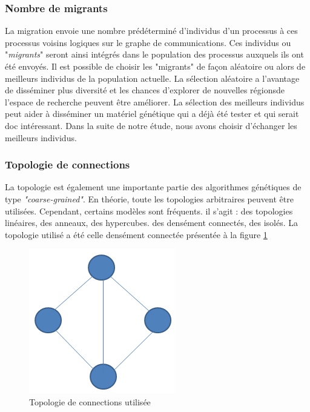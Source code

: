 \documentclass[12pt,a4paper]{article}
\begin{document}
	\subsubsection{Nombre de migrants}
	La migration envoie une nombre prédéterminé d'individus d'un processus à ces processus voisins logiques sur le graphe de communications. Ces individus ou "\emph{migrants}" seront ainsi intégrés dans le population des processus auxquels ils ont été envoyés. Il est possible de choisir les "migrants" de façon aléatoire ou alors de meilleurs individus de la population actuelle. La sélection aléatoire a l'avantage de disséminer plus diversité et les chances d'explorer de nouvelles régionsde l'espace de recherche peuvent être améliorer. La sélection des meilleurs individus peut aider à disséminer un matériel génétique qui a déjà été tester et qui serait doc intéressant. Dans la suite de notre étude, nous avons choisir d'échanger les meilleurs individus.
	\subsubsection{Topologie de connections}
	La topologie est également une importante partie des algorithmes génétiques de type \emph{"coarse-grained"}. En théorie, toute les topologies arbitraires peuvent être utilisées. Cependant, certains modèles sont fréquents. il s'agit : des topologies linéaires, des anneaux, des hypercubes. des densément connectés, des isolés. La topologie utilisé a été celle densément connectée présentée à la figure \ref{fig:topology_fig} 
	
	\begin{figure}[!h]
		\begin{center}
			\includegraphics[scale=.3]{img/topology_fig.png}
			\caption{Topologie de connections utilisée}
			\label{fig:topology_fig}
		\end{center}
	\end{figure}
	
\end{document}
